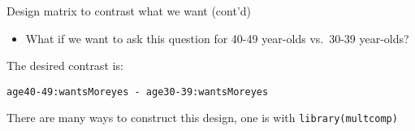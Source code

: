 \documentclass[
  ignorenonframetext,
]{beamer}
\providecommand{\tightlist}{%
  \setlength{\itemsep}{0pt}\setlength{\parskip}{0pt}}
\begin{document}
\begin{frame}[fragile]{Design matrix to contrast what we want (cont'd)}
\protect\hypertarget{design-matrix-to-contrast-what-we-want-contd}{}

\begin{itemize}
\tightlist
\item
  What if we want to ask this question for 40-49 year-olds vs.~30-39
  year-olds?
\end{itemize}

The desired contrast is:

\texttt{age40-49:wantsMoreyes\ -\ age30-39:wantsMoreyes}

There are many ways to construct this design, one is with
\texttt{library(multcomp)}

\end{frame}
\end{document}
